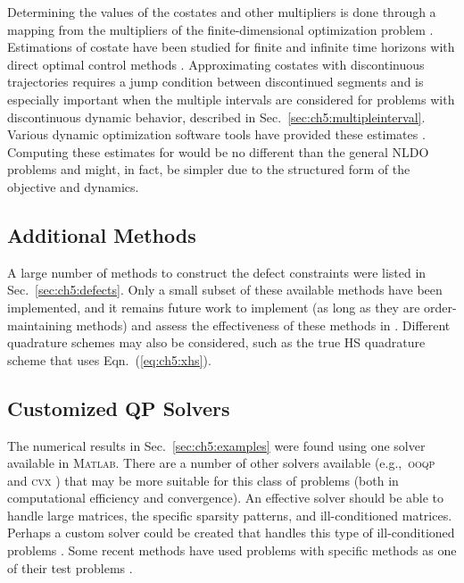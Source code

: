 Determining the values of the costates and other multipliers is done through a mapping from the  multipliers of the finite-dimensional optimization problem \cite{Garg2011a, Francolin2014a}.
Estimations of costate have been studied for finite and infinite time horizons with direct optimal control methods \cite{Garg2011a, Francolin2014a, Darby2011b, Schori2015a}.
Approximating costates with discontinuous trajectories requires a jump condition between discontinued segments \cite{Darby2011b, Schori2015a} and is especially important when the multiple intervals are considered for problems with discontinuous dynamic behavior, described in Sec.~\ref{sec:ch5:multipleinterval}.
Various dynamic optimization software tools have provided these estimates \cite{Patterson2014a, Becerra2015a}.
Computing these estimates for \lqdo{} would be no different than the general NLDO problems and might, in fact, be simpler due to the structured form of the objective and dynamics.

\subsection{Additional Methods} \label{sec:ch5:add:methods}

A large number of methods to construct the defect constraints were listed in Sec.~\ref{sec:ch5:defects}.
Only a small subset of these available methods have been implemented, and it remains future work to implement (as long as they are order-maintaining methods) and assess the effectiveness of these methods in \lqdo.
Different quadrature schemes may also be considered, such as  the true HS quadrature scheme that uses Eqn.~(\ref{eq:ch5:xhs}).

\subsection{Customized {QP} Solvers}

The numerical results in Sec.~\ref{sec:ch5:examples} were found using one solver available in \textsc{Matlab}.
There are a number of other \qp{} solvers available (e.g.,~\textsc{ooqp} \cite{Gertz2003a} and \textsc{cvx} \cite{Grant2008a}) that may be more suitable for this class of problems (both in computational efficiency and convergence).
An effective solver should be able to handle large matrices, the specific sparsity patterns, and ill-conditioned matrices.
Perhaps a custom \qp{} solver could be created that handles this type of ill-conditioned problems \cite{Torsti1972a, Gould2000a, Donoghue2013a, Ghadimi2015a}.
Some recent \qp{} methods have used \lqdo{} problems with specific \dt{} methods as one of their test problems \cite{ Donoghue2013a, Ghadimi2015a}.

